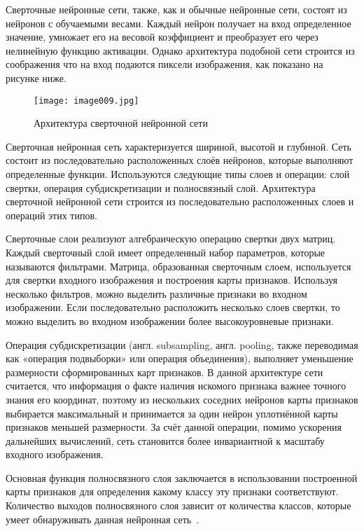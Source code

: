 Сверточные нейронные сети, также, как и обычные нейронные сети, состоят из нейронов с обучаемыми весами. Каждый нейрон получает на вход определенное значение, умножает его на весовой коэффициент и преобразует его через нелинейную функцию активации. Однако архитектура подобной сети строится из соображения что на вход подаются пиксели изображения, как показано на рисунке ниже. 

\begin{figure}[htbp]
\centering
\texttt{[image: image009.jpg]}
\caption{Архитектура сверточной нейронной сети~\cite{eleven}}%
\label{fig:how-to-do-research}
\end{figure}

Сверточная нейронная сеть характеризуется шириной, высотой и глубиной. Сеть состоит из последовательно расположенных слоёв нейронов, которые выполняют определенные функции. Используются следующие типы слоев и операции: слой свертки, операция субдискретизации и полносвязный слой. Архитектура сверточной нейронной сети строится из последовательно расположенных слоев и операций этих типов.

Сверточные слои реализуют алгебраическую операцию свертки двух матриц. Каждый сверточный слой имеет определенный набор параметров, которые называются фильтрами. Матрица, образованная сверточным слоем, используется для свертки входного изображения и построения карты признаков. Используя несколько фильтров, можно выделить различные признаки во входном изображении. Если последовательно расположить несколько слоев свертки, то можно выделить во входном изображении более высокоуровневые признаки.

Операция субдискретизации (англ. subsampling, англ. pooling, также переводимая как «операция подвыборки» или операция объединения), выполняет уменьшение размерности сформированных карт признаков. В данной архитектуре сети считается, что информация о факте наличия искомого признака важнее точного знания его координат, поэтому из нескольких соседних нейронов карты признаков выбирается максимальный и принимается за один нейрон уплотнённой карты признаков меньшей размерности. За счёт данной операции, помимо ускорения дальнейших вычислений, сеть становится более инвариантной к масштабу входного изображения.

Основная функция полносвязного слоя заключается в использовании построенной карты признаков для определения какому классу эту признаки соответствуют. Количество выходов полносвязного слоя зависит от количества классов, которые умеет обнаруживать данная нейронная сеть~\cite{twelve}.

